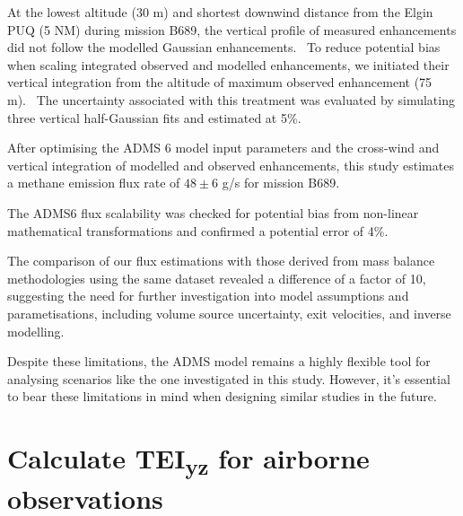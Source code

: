 \documentclass[12pt]{article}
\begin{document}
At the lowest altitude (30 m) and shortest downwind distance from the Elgin PUQ (5 NM) during mission B689, the vertical profile of measured enhancements did not follow the modelled Gaussian enhancements.  To reduce potential bias when scaling integrated observed and modelled enhancements, we initiated their vertical integration from the altitude of maximum observed enhancement (75 m).  The uncertainty associated with this treatment was evaluated by simulating three vertical half-Gaussian fits and estimated at 5\%.

After optimising the ADMS 6 model input parameters and the cross-wind and vertical integration of modelled and observed enhancements, this study estimates a methane emission flux rate of $48 \pm 6$ g/s for mission B689.  

The ADMS6 flux scalability was checked for potential bias from non-linear mathematical transformations and confirmed a potential error of 4\%.

The comparison of our flux estimations with those derived from mass balance methodologies using the same dataset revealed a difference of a factor of 10, suggesting the need for further investigation into model assumptions and parametisations, including volume source uncertainty, exit velocities, and inverse modelling. 

Despite these limitations, the ADMS model remains a highly flexible tool for analysing scenarios like the one investigated in this study. However, it's essential to bear these limitations in mind when designing similar studies in the future.

 
\newpage\printbibliography

\newpage\appendix
\section{Calculate TEI\textsubscript{yz} for airborne observations}
\end{document}
